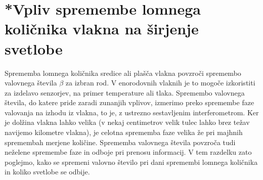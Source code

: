\section{*Vpliv spremembe lomnega količnika vlakna na širjenje svetlobe}

Sprememba lomnega količnika sredice ali plašča vlakna povzroči spremembo
valovnega števila $\beta$ za izbran rod. V enorodovnih vlaknih je to
mogoče izkoristiti za izdelavo senzorjev, na primer temperature ali
tlaka. Spremembo valovnega števila, do katere pride zaradi zunanjih vplivov,
izmerimo preko spremembe faze valovanja na izhodu iz vlakna, to je,
z ustrezno sestavljenim interferometrom. Ker je dolžina vlakna lahko
velika (v nekaj centimetrov velik tulec lahko brez težav navijemo
kilometre vlakna), je celotna sprememba faze velika že pri majhnih
spremembah merjene količine. Sprememba valovnega števila povzroča
tudi neželene spremembe faze in odboje pri prenosu informacij.
V tem razdelku zato poglejmo, kako se spremeni valovno število pri
dani spremembi lomnega količnika in koliko svetlobe se odbije.

